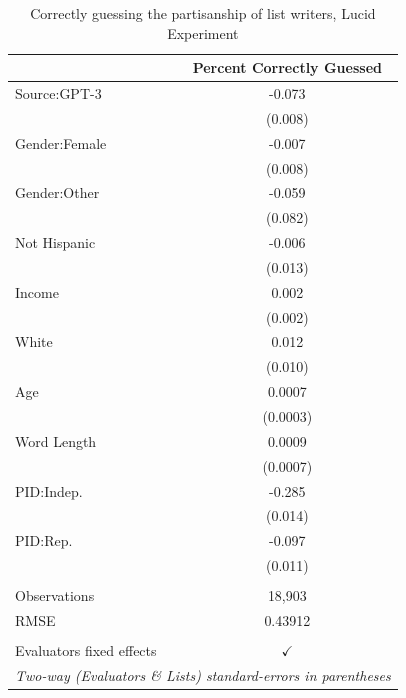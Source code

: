\documentclass[11pt]{article}
\begin{document}
\begin{table}
\centering
%
\begin{tabular}{lc}
\toprule
&Percent Correctly Guessed\\
\midrule Source:GPT-3&-0.073\\
  &(0.008)\\
Gender:Female&-0.007\\
  &(0.008)\\
Gender:Other&-0.059\\
  &(0.082)\\
Not Hispanic&-0.006\\
  &(0.013)\\
Income&0.002\\
  &(0.002)\\
White&0.012\\
  &(0.010)\\
Age&0.0007\\
  &(0.0003)\\
Word Length&0.0009\\
  &(0.0007)\\
PID:Indep.&-0.285\\
  &(0.014)\\
PID:Rep.&-0.097\\
  &(0.011)\\
 &  \\
Observations & 18,903\\
RMSE & 0.43912\\
 &  \\
Evaluators fixed effects & $\checkmark$\\
\bottomrule
\multicolumn{2}{l}{\emph{Two-way (Evaluators \& Lists) standard-errors in parentheses}}\\
\end{tabular}
%
\caption{Correctly guessing the partisanship of list writers, Lucid Experiment}
\label{tab:codcorr}
\end{table}
\end{document}
